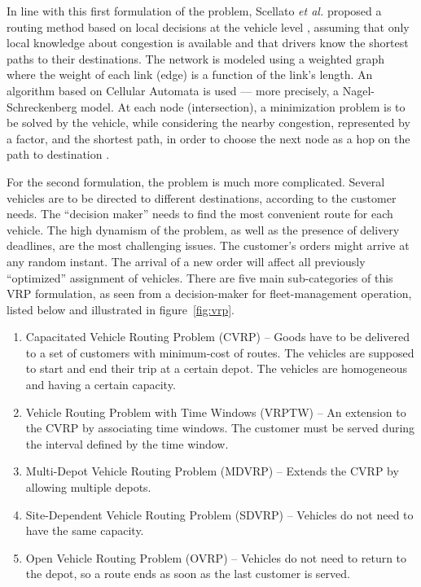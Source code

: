 \documentclass[10pt,onecolumn]{article}
\begin{document}
In line with this first formulation of the problem, Scellato \textit{et al.} proposed a routing method based on local decisions at the vehicle level \cite{Scellato2010}, assuming that only local knowledge about congestion is available and that drivers know the shortest paths to their destinations. The network is modeled using a weighted graph where the weight of each link (edge) is a function of the link's length.
An algorithm based on Cellular Automata is used --- more precisely, a Nagel-Schreckenberg model. 
At each node (intersection), a minimization problem is to be solved by the vehicle, while considering the nearby congestion, represented by a factor, and the shortest path, in order to choose the next node as a hop on the path to destination . 

For the second formulation, the problem is much more complicated. Several vehicles are to be directed to different destinations, according to the customer needs. 
The ``decision maker'' needs to find the most convenient route for each vehicle. 
The high dynamism of the problem, as well as the presence of delivery deadlines, are the most challenging issues.  
The customer's orders might arrive at any random instant. The arrival of a new order will affect all previously ``optimized'' assignment of vehicles. 
There are five main sub-categories of this VRP formulation, as seen from a decision-maker for fleet-management operation, listed below and illustrated in figure~\ref{fig:vrp}.
\begin{enumerate}
 \item Capacitated Vehicle Routing Problem (CVRP) -- Goods have to be delivered to a set of customers with minimum-cost of routes. The vehicles are supposed to start and end their trip at a certain depot. 
	The vehicles are homogeneous and having a certain capacity. 
 \item Vehicle Routing Problem with Time Windows (VRPTW) -- An extension to the CVRP by associating time windows. The customer must be served during the interval defined by the time window.
 \item Multi-Depot Vehicle Routing Problem (MDVRP) -- Extends the CVRP by allowing multiple depots.
 \item Site-Dependent Vehicle Routing Problem (SDVRP) -- Vehicles do not need to have the same capacity.
 \item Open Vehicle Routing Problem (OVRP) -- Vehicles do not need to return to the depot, so a route ends as soon as the last customer is served. 
\end{enumerate}
\end{document}

